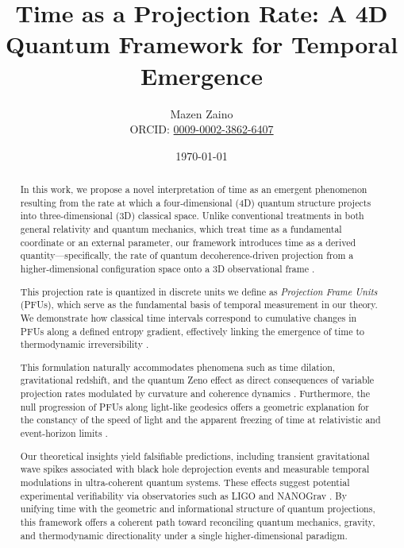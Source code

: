 \documentclass[12pt,a4paper]{article}
\title{Time as a Projection Rate: A 4D Quantum Framework for Temporal Emergence}
\author{Mazen Zaino \\ ORCID: \href{https://orcid.org/0009-0002-3862-6407}{0009-0002-3862-6407}}
\date{\today}
\numberwithin{equation}{section}
\begin{document}
\maketitle

\begin{abstract}
In this work, we propose a novel interpretation of time as an emergent phenomenon resulting from the rate at which a four-dimensional (4D) quantum structure projects into three-dimensional (3D) classical space. Unlike conventional treatments in both general relativity and quantum mechanics, which treat time as a fundamental coordinate or an external parameter, our framework introduces time as a derived quantity—specifically, the rate of quantum decoherence-driven projection from a higher-dimensional configuration space onto a 3D observational frame \cite{zurek_decoherence_2003, rovelli_time_1991}.

This projection rate is quantized in discrete units we define as \emph{Projection Frame Units} (PFUs), which serve as the fundamental basis of temporal measurement in our theory. We demonstrate how classical time intervals correspond to cumulative changes in PFUs along a defined entropy gradient, effectively linking the emergence of time to thermodynamic irreversibility \cite{connes_noncommutative_1995}.

This formulation naturally accommodates phenomena such as time dilation, gravitational redshift, and the quantum Zeno effect as direct consequences of variable projection rates modulated by curvature and coherence dynamics \cite{misra_zeno_1977}. Furthermore, the null progression of PFUs along light-like geodesics offers a geometric explanation for the constancy of the speed of light and the apparent freezing of time at relativistic and event-horizon limits \cite{ashtekar_quantum_2006}.

Our theoretical insights yield falsifiable predictions, including transient gravitational wave spikes associated with black hole deprojection events and measurable temporal modulations in ultra-coherent quantum systems. These effects suggest potential experimental verifiability via observatories such as LIGO and NANOGrav \cite{abbott_observation_2016, arzoumanian_nanograv_2020}. By unifying time with the geometric and informational structure of quantum projections, this framework offers a coherent path toward reconciling quantum mechanics, gravity, and thermodynamic directionality under a single higher-dimensional paradigm.
\end{abstract}
\end{document}
